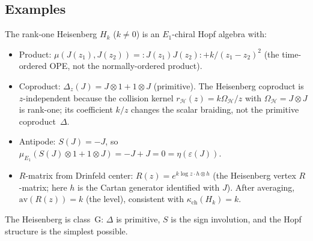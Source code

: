 \subsection{Examples}
\label{subsec:e1-bialg-examples}

\begin{example}
\label{ex:heisenberg-bialgebra}
The rank-one Heisenberg $H_k$ ($k \neq 0$) is an $E_1$-chiral Hopf algebra
with:
\begin{itemize}
 \item Product: $\mu(J(z_1), J(z_2)) = {:}J(z_1)J(z_2){:} + k/(z_1 - z_2)^2$
 (the time-ordered OPE, not the normally-ordered product).
 \item Coproduct: $\Delta_z(J) = J \otimes 1 + 1 \otimes J$ (primitive).
 The Heisenberg coproduct is $z$-independent because the collision
 kernel $r_{\mathcal H}(z)=k\Omega_{\mathcal H}/z$ with
 $\Omega_{\mathcal H}=J\otimes J$ is rank-one; its coefficient $k/z$
 changes the scalar braiding, not the primitive coproduct~$\Delta$.
 \item Antipode: $S(J) = -J$, so $\mu_{E_1}(S(J) \otimes 1 + 1 \otimes J)
 = -J + J = 0 = \eta(\varepsilon(J))$.
 \item $R$-matrix from Drinfeld center: $R(z) = e^{k \log z \cdot h \otimes h}$
 (the Heisenberg vertex $R$-matrix; here $h$ is the Cartan generator
 identified with $J$). After averaging, $\mathrm{av}(R(z)) = k$
 (the level), consistent with $\kappa_{\mathrm{ch}}(H_k) = k$.
\end{itemize}
The Heisenberg is class~G: $\Delta$ is primitive, $S$ is the sign
involution, and the Hopf structure is the simplest possible.
\end{example}

